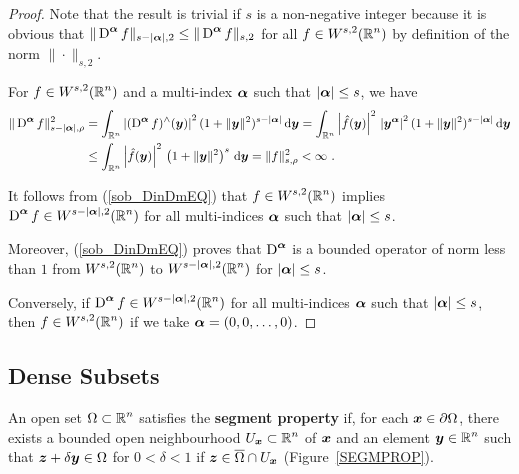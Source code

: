 \begin{proof}
Note that the result is trivial if $s$ is a non-negative integer
because it is obvious that
$\displaystyle \|\operatorname{D}^{{\bm{\alpha}}} f\|_{s-|{\bm{\alpha}}|,2} \leq
\|\operatorname{D}^{{\bm{\alpha}}} f\|_{s,2}$ for all $\displaystyle f \in W^{s,2}(\mathbb{R}^n)$
by definition of the norm $\|\cdot\|_{s,2}$.

For $\displaystyle f \in W^{s,2}(\mathbb{R}^n)$ and a multi-index ${\bm{\alpha}}$
such that $|{\bm{\alpha}}| \leq s$, we have
\begin{align}
\|\operatorname{D}^{{\bm{\alpha}}} f\|_{s-|{\bm{\alpha}}|,\rho}^2 &= \int_{\mathbb{R}^n}
\left| (\operatorname{D}^{{\bm{\alpha}}} f)^\wedge({\bm{y}}) \right|^2
(1+\|{\bm{y}}\|^2)^{s-|{\bm{\alpha}}|} \,\mathrm{d}{{\bm{y}}}
= \int_{\mathbb{R}^n}
\left|\hat{f}({\bm{y}}) \right|^2 \, \left| {\bm{y}}^{{\bm{\alpha}}} \right|^2
(1+\|{\bm{y}}\|^2)^{s-|{\bm{\alpha}}|} \,\mathrm{d}{{\bm{y}}} \nonumber \\
&\leq \int_{\mathbb{R}^n} \left|\hat{f}({\bm{y}}) \right|^2 \,
\left( 1 + \|{\bm{y}}\|^2\right)^s \,\mathrm{d}{{\bm{y}}} = \|f\|_{s,\rho}^2
< \infty \ . \label{sob_DinDmEQ}
\end{align}

It follows from (\ref{sob_DinDmEQ}) that
$\displaystyle f\in W^{s,2}(\mathbb{R}^n)$ implies
$\displaystyle \operatorname{D}^{{\bm{\alpha}}} f \in W^{s-|{\bm{\alpha}}|,2}(\mathbb{R}^n)$
for all multi-indices ${\bm{\alpha}}$ such that $|{\bm{\alpha}}|\leq s$.

Moreover, (\ref{sob_DinDmEQ}) proves that
$\displaystyle \operatorname{D}^{{\bm{\alpha}}}$ is a bounded operator
of norm less than $1$ from $\displaystyle W^{s,2}(\mathbb{R}^n)$ to
$\displaystyle W^{s-|{\bm{\alpha}}|,2}(\mathbb{R}^n)$ for $|{\bm{\alpha}}|\leq s$.

Conversely, if $\displaystyle \operatorname{D}^{{\bm{\alpha}}} f \in
W^{s-|{\bm{\alpha}}|,2}(\mathbb{R}^n)$ for
all multi-indices ${\bm{\alpha}}$ such that $|{\bm{\alpha}}|\leq s$, then
$\displaystyle f\in W^{s,2}(\mathbb{R}^n)$ if we take ${\bm{\alpha}} = (0,0,\ldots,0)$.
\end{proof}

\subsection{Dense Subsets}

\begin{defn}
An open set $\displaystyle \Omega \subset \mathbb{R}^n$ satisfies
the {\bfseries segment property} if, for each
${\bm{x}} \in \partial \Omega$,
there exists a bounded open neighbourhood
$\displaystyle U_{{\bm{x}}} \subset \mathbb{R}^n$ of ${\bm{x}}$ and an
element $\displaystyle {\bm{y}} \in \mathbb{R}^n$ such that
${\bm{z}} + \delta {\bm{y}} \in \Omega$ for $0<\delta < 1$ if
${\bm{z}} \in \overline{\Omega} \cap U_{{\bm{x}}}$ (Figure~\ref{SEGMPROP}).
\end{defn}

